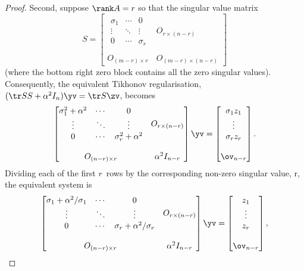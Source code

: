 \begin{proof}
Second, suppose \(\rank A=r\) so that the singular value matrix
\begin{equation*}
S=\begin{bmatrix} \begin{matrix} \sigma_1&\cdots&0\\
\vdots&\ddots&\vdots\\
0&\cdots&\sigma_r \end{matrix} & 
O_{r\times (n-r)}\\\,\\
O_{(m-r)\times r}&O_{(m-r)\times (n-r)}\end{bmatrix}
\end{equation*}
(where the bottom right zero block contains all the zero singular values).
Consequently, the equivalent Tikhonov regularisation, \((\tr SS+\alpha^2I_n)\yv=\tr S\zv\), becomes
\begin{equation*}
\begin{bmatrix} \begin{matrix} \sigma_1^2+\alpha^2&\cdots&0\\
\vdots&\ddots&\vdots\\
0&\cdots&\sigma_r^2+\alpha^2 \end{matrix} & 
O_{r\times (n-r)}\\\,\\
O_{(n-r)\times r}&\alpha^2I_{n-r}\end{bmatrix}\yv
=\begin{bmatrix} \sigma_1z_1\\\vdots\\\sigma_rz_r\\\,\\\ov_{n-r} \end{bmatrix}.
\end{equation*}
Dividing each of the first \(r\)~rows by the corresponding non-zero singular value, \hlist\sigma r, the equivalent system is
\begin{equation*}
\begin{bmatrix} \begin{matrix} \sigma_1+\alpha^2/\sigma_1&\cdots&0\\
\vdots&\ddots&\vdots\\
0&\cdots&\sigma_r+\alpha^2/\sigma_r \end{matrix} & 
O_{r\times (n-r)}\\\,\\
O_{(n-r)\times r}&\alpha^2I_{n-r}\end{bmatrix}\yv
=\begin{bmatrix} z_1\\\vdots\\z_r\\\,\\\ov_{n-r} \end{bmatrix},

\end{equation*}
\end{proof}
